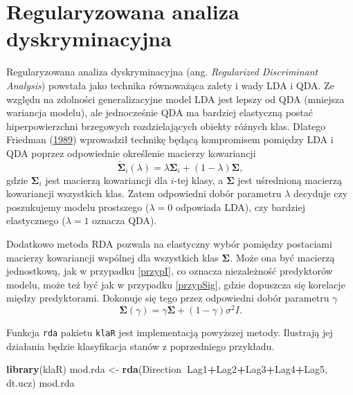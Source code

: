 \documentclass[]{book}
\newenvironment{Shaded}{\begin{snugshade}}{\end{snugshade}}
\newcommand{\KeywordTok}[1]{\textcolor[rgb]{0.13,0.29,0.53}{\textbf{#1}}}
\newcommand{\NormalTok}[1]{#1}
\newcommand{\OperatorTok}[1]{\textcolor[rgb]{0.81,0.36,0.00}{\textbf{#1}}}
\newcommand{\StringTok}[1]{\textcolor[rgb]{0.31,0.60,0.02}{#1}}
\theoremstyle{plain}
\theoremstyle{definition}
\theoremstyle{definition}
\theoremstyle{definition}
\theoremstyle{definition}
\theoremstyle{remark}
\let\BeginKnitrBlock\begin \let\EndKnitrBlock\end
\begin{document}
\hypertarget{regularyzowana-analiza-dyskryminacyjna}{%
\section{Regularyzowana analiza dyskryminacyjna}\label{regularyzowana-analiza-dyskryminacyjna}}

Regularyzowana analiza dyskryminacyjna (ang. \emph{Regularized Discriminant Analysis}) powstała jako technika równoważąca zalety i wady LDA i QDA. Ze względu na zdolności generalizacyjne model LDA jest lepszy od QDA (mniejsza wariancja modelu), ale jednocześnie QDA ma bardziej elastyczną postać hiperpowierzchni brzegowych rozdzielających obiekty różnych klas. Dlatego Friedman (\protect\hyperlink{ref-friedman1989}{1989}) wprowadził technikę będącą kompromisem pomiędzy LDA i QDA poprzez odpowiednie określenie macierzy kowariancji
\begin{equation}
    \tilde{\boldsymbol \Sigma}_i(\lambda) = \lambda\boldsymbol\Sigma_i + (1-\lambda)\boldsymbol\Sigma,
\end{equation}
gdzie \(\boldsymbol \Sigma_i\) jest macierzą kowariancji dla \(i\)-tej klasy, a \(\boldsymbol \Sigma\) jest uśrednioną macierzą kowariancji wszystkich klas. Zatem odpowiedni dobór parametru \(\lambda\) decyduje czy poszukujemy modelu prostszego (\(\lambda = 0\) odpowiada LDA), czy bardziej elastycznego (\(\lambda=1\) oznacza QDA).

Dodatkowo metoda RDA pozwala na elastyczny wybór pomiędzy postaciami macierzy kowariancji wspólnej dla wszystkich klas \(\boldsymbol\Sigma\). Może ona być macierzą jednostkową, jak w przypadku \ref{przypI}, co oznacza niezależność predyktorów modelu, może też być jak w przypadku \ref{przypSig}, gdzie dopuszcza się korelacje między predyktorami. Dokonuje się tego przez odpowiedni dobór parametru \(\gamma\)
\begin{equation}
    \boldsymbol \Sigma(\gamma) = \gamma\boldsymbol \Sigma+(1-\gamma)\sigma^2I.
\end{equation}

\BeginKnitrBlock{example}
\protect\hypertarget{exm:rda}{}{\label{exm:rda} }Funkcja \texttt{rda} pakietu \texttt{klaR} jest implementacją powyższej metody. Ilustrają jej działania będzie klasyfikacja stanów z poprzedniego przykładu.
\EndKnitrBlock{example}

\begin{Shaded}
\begin{Highlighting}[]
\KeywordTok{library}\NormalTok{(klaR)}
\NormalTok{mod.rda <-}\StringTok{ }\KeywordTok{rda}\NormalTok{(Direction}\OperatorTok{~}\NormalTok{Lag1}\OperatorTok{+}\NormalTok{Lag2}\OperatorTok{+}\NormalTok{Lag3}\OperatorTok{+}\NormalTok{Lag4}\OperatorTok{+}\NormalTok{Lag5, dt.ucz)}
\NormalTok{mod.rda}
\end{Highlighting}
\end{Shaded}
\end{document}
